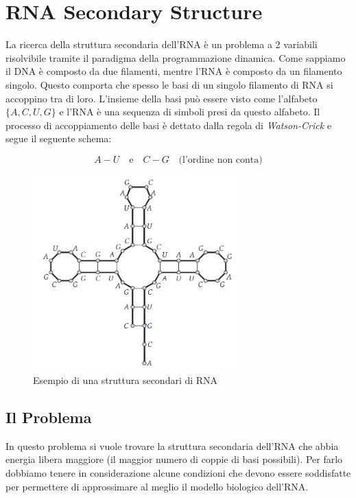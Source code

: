 \chapter{RNA Secondary Structure }

La ricerca della struttura secondaria dell'RNA è un problema a 2 variabili
risolvibile tramite il paradigma della programmazione dinamica. Come sappiamo il
DNA è composto da due filamenti, mentre l'RNA è composto da un filamento
singolo. Questo comporta che spesso le basi di un singolo filamento di RNA si
accoppino tra di loro. L'insieme della basi può essere visto come l'alfabeto
$\{A, C, U, G\}$ e l'RNA è una sequenza di simboli presi da questo alfabeto. Il
processo di accoppiamento delle basi è dettato dalla regola di \textit{Watson-Crick} e
segue il seguente schema:

\[
    A - U \ \ \ \textrm{ e } \ \ \ C - G \ \ \ \textrm{ (l'ordine non conta)}
\]

\begin{figure}[H]
    \centering
    \includegraphics[width=8cm, keepaspectratio]{capitoli/imgs/rna_esempio1.png}
    \caption{Esempio di una struttura secondari di RNA} %
\end{figure}

\section{Il Problema}

In questo problema si vuole trovare la struttura secondaria dell'RNA che abbia
energia libera maggiore (il maggior numero di coppie di basi possibili). Per
farlo dobbiamo tenere in considerazione alcune condizioni che devono essere
soddisfatte per permettere di approssimare al meglio il modello biologico
dell'RNA.\\

